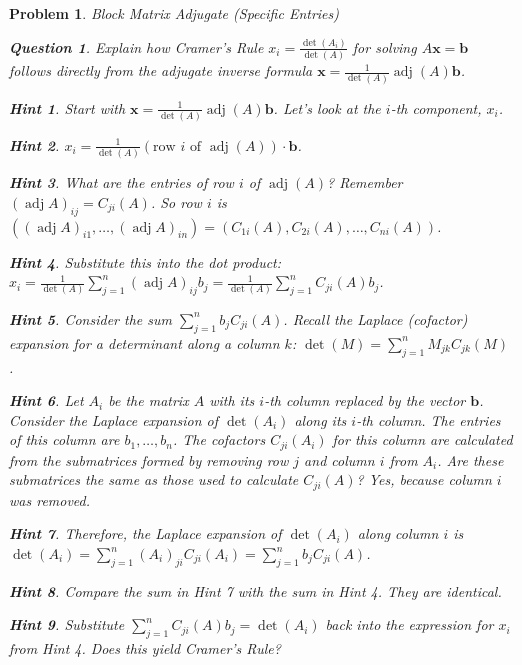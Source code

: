 \documentclass[12pt]{article}
\newtheorem{problem}{Problem}[section]
\newtheorem{question}{Question}[problem]
\theoremstyle{definition}
\newtheorem{hint}{Hint}[question]
\newcommand{\adj}{\operatorname{adj}}
\newcommand{\detm}{\operatorname{det}}
\newcommand{\vect}[1]{\mathbf{#1}} %
\begin{document}
\begin{problem}{Block Matrix Adjugate (Specific Entries)}
    \begin{question}
        Explain how Cramer's Rule $x_i = \frac{\detm(A_i)}{\detm(A)}$ for solving $A\vect{x}=\vect{b}$ follows directly from the adjugate inverse formula $\vect{x} = \frac{1}{\detm(A)} \adj(A) \vect{b}$.
    \end{question}
    \begin{hint}
        Start with $\vect{x} = \frac{1}{\detm(A)} \adj(A) \vect{b}$. Let's look at the $i$-th component, $x_i$.
    \end{hint}
    \begin{hint}
        $x_i = \frac{1}{\detm(A)} (\text{row } i \text{ of } \adj(A)) \cdot \vect{b}$.
    \end{hint}
    \begin{hint}
        What are the entries of row $i$ of $\adj(A)$? Remember $(\adj A)_{ij} = C_{ji}(A)$. So row $i$ is $((\adj A)_{i1}, \dots, (\adj A)_{in}) = (C_{1i}(A), C_{2i}(A), \dots, C_{ni}(A))$.
    \end{hint}
    \begin{hint}
        Substitute this into the dot product: $x_i = \frac{1}{\detm(A)} \sum_{j=1}^{n} (\adj A)_{ij} b_j = \frac{1}{\detm(A)} \sum_{j=1}^{n} C_{ji}(A) b_j$.
    \end{hint}
    \begin{hint}
        Consider the sum $\sum_{j=1}^{n} b_j C_{ji}(A)$. Recall the Laplace (cofactor) expansion for a determinant along a column $k$: $\detm(M) = \sum_{j=1}^{n} M_{jk} C_{jk}(M)$.
    \end{hint}
    \begin{hint}
        Let $A_i$ be the matrix $A$ with its $i$-th column replaced by the vector $\vect{b}$. Consider the Laplace expansion of $\detm(A_i)$ along its $i$-th column. The entries of this column are $b_1, \dots, b_n$. The cofactors $C_{ji}(A_i)$ for this column are calculated from the submatrices formed by removing row $j$ and column $i$ from $A_i$. Are these submatrices the same as those used to calculate $C_{ji}(A)$? Yes, because column $i$ was removed.
    \end{hint}
    \begin{hint}
        Therefore, the Laplace expansion of $\detm(A_i)$ along column $i$ is $\detm(A_i) = \sum_{j=1}^{n} (A_i)_{ji} C_{ji}(A_i) = \sum_{j=1}^{n} b_j C_{ji}(A)$.
    \end{hint}
    \begin{hint}
        Compare the sum in Hint 7 with the sum in Hint 4. They are identical.
    \end{hint}
    \begin{hint}
        Substitute $\sum_{j=1}^{n} C_{ji}(A) b_j = \detm(A_i)$ back into the expression for $x_i$ from Hint 4. Does this yield Cramer's Rule?
    \end{hint}
\end{problem}
\end{document}
